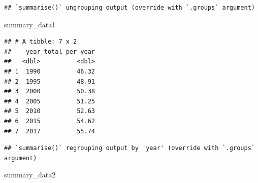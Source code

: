 \documentclass[
  12pt,
  krantz2]{krantz}
\makeatletter
\newenvironment{Shaded}{\begin{snugshade}}{\end{snugshade}}
\newcommand{\DataTypeTok}[1]{\textcolor[rgb]{0.13,0.29,0.53}{#1}}
\newcommand{\KeywordTok}[1]{\textcolor[rgb]{0.13,0.29,0.53}{\textbf{#1}}}
\newcommand{\NormalTok}[1]{#1}
\newcommand{\OperatorTok}[1]{\textcolor[rgb]{0.81,0.36,0.00}{\textbf{#1}}}
\newcommand{\StringTok}[1]{\textcolor[rgb]{0.31,0.60,0.02}{#1}}
\newenvironment{kframe}{%
\medskip{}
\setlength{\fboxsep}{.8em}
 \def\at@end@of@kframe{}%
 \ifinner\ifhmode%
  \def\at@end@of@kframe{\end{minipage}}%
  \begin{minipage}{\columnwidth}%
 \fi\fi%
 \def\FrameCommand##1{\hskip\@totalleftmargin \hskip-\fboxsep
 \colorbox{shadecolor}{##1}\hskip-\fboxsep
     \hskip-\linewidth \hskip-\@totalleftmargin \hskip\columnwidth}%
 \MakeFramed {\advance\hsize-\width
   \@totalleftmargin\z@ \linewidth\hsize
   \@setminipage}}%
 {\par\unskip\endMakeFramed%
 \at@end@of@kframe}
\renewenvironment{Shaded}{\begin{kframe}}{\end{kframe}}
\makeatother
\begin{document}
\begin{Shaded}
\end{Shaded}

\begin{verbatim}
## `summarise()` ungrouping output (override with `.groups` argument)
\end{verbatim}

\begin{Shaded}
\begin{Highlighting}[]
\NormalTok{summary_data1}
\end{Highlighting}
\end{Shaded}

\begin{verbatim}
## # A tibble: 7 x 2
##    year total_per_year
##   <dbl>          <dbl>
## 1  1990          46.32
## 2  1995          48.91
## 3  2000          50.38
## 4  2005          51.25
## 5  2010          52.63
## 6  2015          54.62
## 7  2017          55.74
\end{verbatim}

\begin{Shaded}
\end{Shaded}

\begin{verbatim}
## `summarise()` regrouping output by 'year' (override with `.groups` argument)
\end{verbatim}

\begin{Shaded}
\begin{Highlighting}[]
\NormalTok{summary_data2}
\end{Highlighting}
\end{Shaded}
\end{document}
